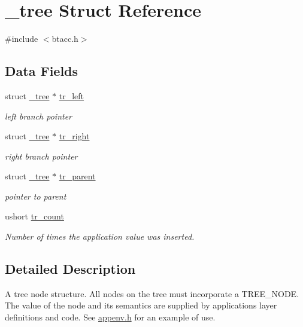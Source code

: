 \hypertarget{struct__tree}{\section{\-\_\-tree Struct Reference}
\label{struct__tree}
}


{\ttfamily \#include $<$btacc.\-h$>$}

\subsection*{Data Fields}
\begin{DoxyCompactItemize}
\item 
struct \hyperlink{struct__tree}{\-\_\-tree} $\ast$ \hyperlink{struct__tree_acbad35e3455b86aa72f2f7d69955cd4c}{tr\-\_\-left}
\begin{DoxyCompactList}\small\item\em left branch pointer \end{DoxyCompactList}\item 
struct \hyperlink{struct__tree}{\-\_\-tree} $\ast$ \hyperlink{struct__tree_ae720de698b6a6f67364efc173bd8e32b}{tr\-\_\-right}
\begin{DoxyCompactList}\small\item\em right branch pointer \end{DoxyCompactList}\item 
struct \hyperlink{struct__tree}{\-\_\-tree} $\ast$ \hyperlink{struct__tree_a3f0d5ba862413b2c2ea0a6859a701412}{tr\-\_\-parent}
\begin{DoxyCompactList}\small\item\em pointer to parent \end{DoxyCompactList}\item 
ushort \hyperlink{struct__tree_ac502c18e883004c9cd5ed0a5d32812a3}{tr\-\_\-count}
\begin{DoxyCompactList}\small\item\em Number of times the application value was inserted. \end{DoxyCompactList}\end{DoxyCompactItemize}


\subsection{Detailed Description}
A tree node structure. All nodes on the tree must incorporate a T\-R\-E\-E\-\_\-\-N\-O\-D\-E. The value of the node and its semantics are supplied by applications layer definitions and code. See \hyperlink{appenv_8h}{appenv.\-h} for an example of use. 

